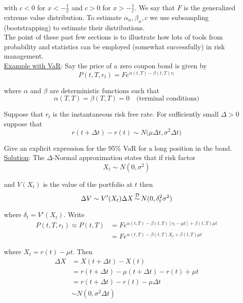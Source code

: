 \documentclass[12pt]{article}
\newlength\tindent
\renewcommand{\indent}{\hspace*{\tindent}}
\newcommand{\indist}{\,{\buildrel \mathcal D \over \sim}\,}
\begin{document}
with $c < 0$ for $x < -\frac{1}{c}$ and $c > 0$ for $x > -\frac{1}{c}$. We say that $F$ is the generalized extreme value distribution. To estimate $\alpha_n, \beta_n, c$ we use subsampling (bootstrapping) to estimate their distributions. \\

\indent The point of these past few sections is to illustrate how lots of tools from probability and statistics can be employed (somewhat successfully) in risk management. \\

\underline{Example with VaR}: Say the price of a zero coupon bond is given by
\begin{equation*}
	P(t, T, r_t) = Fe^{\alpha(t, T) - \beta(t,T)r_t}
\end{equation*}

where $\alpha$ and $\beta$ are deterministic functions such that
\begin{equation*}
	\alpha(T, T) = \beta(T, T) = 0 \quad \text{(terminal conditions)}
\end{equation*}

Suppose that $r_t$ is the instantaneous risk free rate. For sufficiently small $\Delta > 0$ suppose that
\begin{equation*}
	r(t + \Delta t) - r(t) \sim N \Big(\mu\Delta t, \sigma^2\Delta t \Big)
\end{equation*} 

Give an explicit expression for the 95\% VaR for a long position in the bond. \\

\underline{Solution}: The $\Delta$-Normal approximation states that if risk factor
\begin{equation*}
	X_t \sim N(0, \sigma^2)
\end{equation*}

and $V(X_t)$ is the value of the portfolio at $t$ then
\begin{equation*}
	\Delta V \sim V'(X_t)\Delta X \indist N(0, \delta^2_t \sigma^2) 
\end{equation*}

where $\delta_t = V'(X_t)$. Write
\begin{align*}
	P(t, T, r_t) \approx P(t, T) &= Fe^{\alpha(t, T) - \beta(t, T)[r_t - \mu t] + \beta(t, T)\mu t} \\
	&= Fe^{\alpha(t, T) - \beta(t,T)X_t + \beta(t, T)\mu t}
\end{align*}

where $X_t = r(t) - \mu t$. Then
\begin{align*}
	\Delta X &= X(t + \Delta t) - X(t) \\
	&= r(t + \Delta t) - \mu(t + \Delta t) - r(t) + \mu t \\
	&= r(t + \Delta t) - r(t) - \mu\Delta t \\
	&\sim N(0, \sigma^2\Delta t)
\end{align*}
\end{document}
